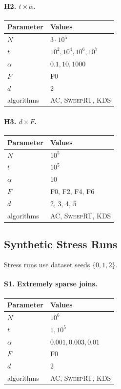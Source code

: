 \documentclass[11pt]{article}
\newcommand{\AC}{\textsc{AC}}
\newcommand{\SweepRT}{\textsc{SweepRT}}
\newcommand{\KDS}{\textsc{KDS}}
\begin{document}
\paragraph{H2. $t\times\alpha$.}
\begin{center}
\begin{tabularx}{0.82\linewidth}{@{}lY@{}}
\toprule
Parameter & Values \\
\midrule
$N$ & $3\cdot10^5$ \\
$t$ & $10^2,10^4,10^6,10^7$ \\
$\alpha$ & $0.1,10,1000$ \\
$F$ & F0 \\
$d$ & 2 \\
algorithms & \AC, \SweepRT, \KDS \\
\bottomrule
\end{tabularx}
\end{center}

\paragraph{H3. $d\times F$.}
\begin{center}
\begin{tabularx}{0.82\linewidth}{@{}lY@{}}
\toprule
Parameter & Values \\
\midrule
$N$ & $10^5$ \\
$t$ & $10^5$ \\
$\alpha$ & 10 \\
$F$ & F0, F2, F4, F6 \\
$d$ & 2, 3, 4, 5 \\
algorithms & \AC, \SweepRT, \KDS \\
\bottomrule
\end{tabularx}
\end{center}

\subsection{Synthetic Stress Runs}
Stress runs use dataset seeds $\{0,1,2\}$.

\paragraph{S1. Extremely sparse joins.}
\begin{center}
\begin{tabularx}{0.82\linewidth}{@{}lY@{}}
\toprule
Parameter & Values \\
\midrule
$N$ & $10^6$ \\
$t$ & $1,10^5$ \\
$\alpha$ & $0.001,0.003,0.01$ \\
$F$ & F0 \\
$d$ & 2 \\
algorithms & \AC, \SweepRT, \KDS \\
\bottomrule
\end{tabularx}
\end{center}
\end{document}
